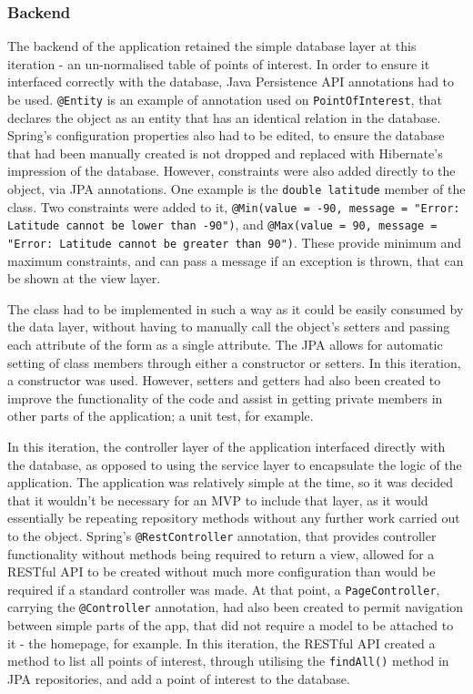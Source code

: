 \subsubsection{Backend}

The backend of the application retained the simple database layer at this iteration - an un-normalised table of points of interest. In order to ensure it interfaced correctly with the database, Java Persistence API annotations had to be used. \texttt{@Entity} is an example of annotation used on \texttt{PointOfInterest}, that declares the object as an entity that has an identical relation in the database. Spring's configuration properties also had to be edited, to ensure the database that had been manually created is not dropped and replaced with Hibernate's impression of the database. However, constraints were also added directly to the object, via JPA annotations. One example is the \texttt{double latitude} member of the class. Two constraints were added to it, \texttt{@Min(value = -90, message = "Error: Latitude cannot be lower than -90")}, and \texttt{@Max(value = 90, message = "Error: Latitude cannot be greater than 90")}. These provide minimum and maximum constraints, and can pass a message if an exception is thrown, that can be shown at the view layer.

The class had to be implemented in such a way as it could be easily consumed by the data layer, without having to manually call the object's setters and passing each attribute of the form as a single attribute. The JPA allows for automatic setting of class members through either a constructor or setters. In this iteration, a constructor was used. However, setters and getters had also been created to improve the functionality of the code and assist in getting private members in other parts of the application; a unit test, for example.

In this iteration, the controller layer of the application interfaced directly with the database, as opposed to using the service layer to encapsulate the logic of the application. The application was relatively simple at the time, so it was decided that it wouldn't be necessary for an MVP to include that layer, as it would essentially be repeating repository methods without any further work carried out to the object. Spring's \texttt{@RestController} annotation, that provides controller functionality without methods being required to return a view, allowed for a RESTful API to be created without much more configuration than would be required if a standard controller was made. At that point, a \texttt{PageController}, carrying the \texttt{@Controller} annotation, had also been created to permit navigation between simple parts of the app, that did not require a model to be attached to it - the homepage, for example. In this iteration, the RESTful API created a method to list all points of interest, through utilising the \texttt{findAll()} method in JPA repositories, and add a point of interest to the database.

